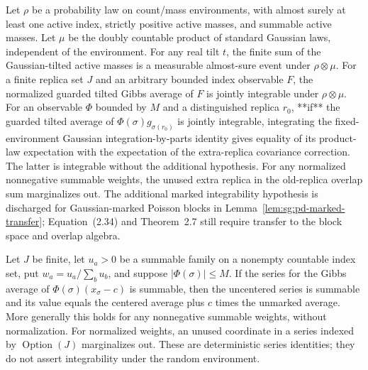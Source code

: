 \begin{lemma}\label{lem:sg:pd-ibp-product}
  \leanok
  Let $\rho$ be a probability law on count/mass environments, with almost surely at
  least one active index, strictly positive active masses, and summable active masses.
  Let $\mu$ be the doubly countable product of standard Gaussian laws, independent of
  the environment. For any real tilt $t$, the finite sum of the Gaussian-tilted
  active masses is a measurable almost-sure event under $\rho\otimes\mu$.
  For a finite replica set $J$ and an arbitrary bounded index observable $F$,
  the normalized guarded tilted Gibbs average of $F$ is jointly integrable under
  $\rho\otimes\mu$. For an observable $\Phi$ bounded by $M$ and a distinguished
  replica $r_0$, **if** the guarded tilted average of
  $\Phi(\sigma)g_{\sigma(r_0)}$ is jointly integrable, integrating the
  fixed-environment Gaussian integration-by-parts identity gives equality of its
  product-law expectation with the expectation of the extra-replica covariance
  correction. The latter is integrable without the additional hypothesis.
  For any normalized nonnegative summable weights, the unused extra replica
  in the old-replica overlap sum marginalizes out. The additional marked
  integrability hypothesis is discharged for Gaussian-marked Poisson blocks
  in Lemma~\ref{lem:sg:pd-marked-transfer}; Equation~(2.34) and Theorem~2.7
  still require transfer to the block space and overlap algebra.
\end{lemma}

\begin{lemma}\label{lem:sg:pd-centering}
  \leanok
  Let $J$ be finite, let $u_a>0$ be a summable family on a nonempty countable
  index set, put $w_a=u_a/\sum_bu_b$, and suppose $|\Phi(\sigma)|\le M$.
  If the series for the Gibbs average of $\Phi(\sigma)(x_\sigma-c)$ is
  summable, then the uncentered series is summable and its value equals the
  centered average plus $c$ times the unmarked average. More generally this
  holds for any nonnegative summable weights, without normalization. For
  normalized weights, an unused coordinate in a series indexed by
  $\operatorname{Option}(J)$ marginalizes out. These are deterministic series
  identities; they do not assert integrability under the random environment.
\end{lemma}


